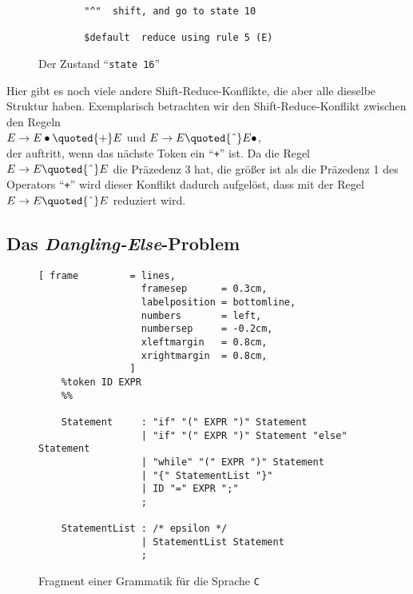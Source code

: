 \begin{enumerate}
\begin{figure}[!ht]
\begin{Verbatim}
        "^"  shift, and go to state 10
    
        $default  reduce using rule 5 (E)
    \end{Verbatim} 
    \vspace*{-0.3cm}
    \caption{Der Zustand ``\texttt{state 16}''}
    \label{fig:state16}
  \end{figure}

      Hier gibt es noch viele andere Shift-Reduce-Konflikte, die aber alle dieselbe Struktur haben.
      Exemplarisch betrachten wir den Shift-Reduce-Konflikt zwischen den Regeln
      \\[0.2cm]
      \hspace*{1.3cm}
      $E \rightarrow E \bullet \quoted{+} E$ \quad und \quad
      $E \rightarrow E \quoted{\symbol{94}} E  \bullet$,
      \\[0.2cm]
      der auftritt, wenn das n\"achste Token ein ``\texttt{+}'' ist.  Da die Regel 
      $E \rightarrow E \quoted{\symbol{94}} E$ die Pr\"azedenz 3 hat, die gr\"o{\ss}er ist als die Pr\"azedenz 1 des
      Operators ``\texttt{+}'' wird dieser Konflikt dadurch aufgel\"ost, dass mit der Regel 
      $E \rightarrow E \quoted{\symbol{94}} E$ reduziert wird. 
\end{enumerate}    
\pagebreak

\subsection{Das \emph{Dangling-Else}-Problem}
\begin{figure}[!ht]
\centering
\begin{Verbatim}[ frame         = lines, 
                  framesep      = 0.3cm, 
                  labelposition = bottomline,
                  numbers       = left,
                  numbersep     = -0.2cm,
                  xleftmargin   = 0.8cm,
                  xrightmargin  = 0.8cm,
                ]
    %token ID EXPR 
    %%
    
    Statement     : "if" "(" EXPR ")" Statement 
                  | "if" "(" EXPR ")" Statement "else" Statement
                  | "while" "(" EXPR ")" Statement 
                  | "{" StatementList "}"
                  | ID "=" EXPR ";"
                  ;
    
    StatementList : /* epsilon */
                  | StatementList Statement
                  ;
\end{Verbatim}
\vspace*{-0.3cm}
\caption{Fragment einer Grammatik f\"ur die Sprache \texttt{C}}
\label{fig:dangling-else.y}
\end{figure}

